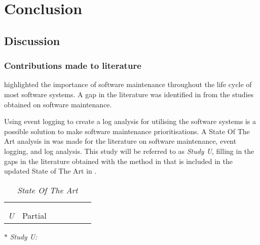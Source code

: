 \chapter{Conclusion}
\label{chap:4}

\section{Discussion}

\subsection{Contributions made to literature}
 highlighted the importance of software maintenance throughout the life cycle of most software systems. A gap in the literature was identified in  from the studies obtained on software maintenance. \par Using event logging to create a log analysis for utilising the software systems is a possible solution to make software maintenance prioritisations. A State Of The Art analysis in  was made for the literature on software maintenance, event logging, and log analysis. This study will be referred to as \textit{Study U}, filling in the gaps in the literature obtained with the method in  that is included in the updated State of The Art in .

\begin{table}[!htb]
	\centering
	\caption[State Of The Art]
	{\textit{State Of The Art}}
	\label{tbl:ch4_stateOfTheArt}
	\begin{threeparttable}
		\begin{tabularx}{\textwidth}{cYYYYYY}
			\toprule
			 &  &  &  \\ 
			 \cmidrule(lr){2-4} \cmidrule(lr){5-6} \cmidrule(lr){7-7}
			 & \RaggedRight {} & \RaggedRight {} & \RaggedRight {} &  &  & \RaggedRight {} \\ 		
			\midrule
				\sotaCore
				\textit{U}\tnote{$\ast$} & Partial & \cmark & \cmark & \cmark & \cmark & \cmark \\
			\bottomrule
		\end{tabularx}
		\begin{tablenotes}\footnotesize
			\item[$\ast$] \textit{Study U:~\ThesisTitle}
		\end{tablenotes}
	\end{threeparttable}
\end{table}

